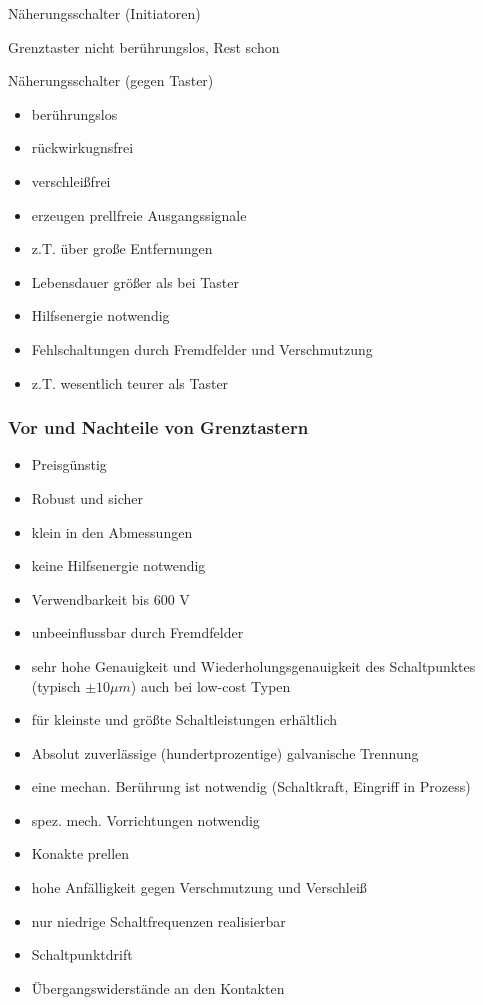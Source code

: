 \documentclass[a4paper]{scrartcl}
\begin{document}
Näherungsschalter (Initiatoren)

Grenztaster nicht berührungslos, Rest schon

Näherungsschalter (gegen Taster)
\begin{itemize}
\item berührungslos
\item rückwirkugnsfrei
\item verschleißfrei
\item erzeugen prellfreie Ausgangssignale
\item z.T. über große Entfernungen
\item Lebensdauer größer als bei Taster
\item Hilfsenergie notwendig
\item Fehlschaltungen durch Fremdfelder und Verschmutzung
\item z.T. wesentlich teurer als Taster
\end{itemize}

\subsubsection{Vor und Nachteile von Grenztastern}
\begin{itemize}
\item Preisgünstig
\item Robust und sicher
\item klein in den Abmessungen
\item keine Hilfsenergie notwendig
\item Verwendbarkeit bis 600 V
\item unbeeinflussbar durch Fremdfelder
\item sehr hohe Genauigkeit und Wiederholungsgenauigkeit des Schaltpunktes (typisch $\pm 10 \mu m$) auch bei low-cost Typen
\item für kleinste und größte Schaltleistungen erhältlich
\item Absolut zuverlässige (hundertprozentige) galvanische Trennung
\item eine mechan. Berührung ist notwendig (Schaltkraft, Eingriff in Prozess)
\item spez. mech. Vorrichtungen notwendig
\item Konakte prellen
\item hohe Anfälligkeit gegen Verschmutzung und Verschleiß
\item nur niedrige Schaltfrequenzen realisierbar
\item Schaltpunktdrift
\item Übergangswiderstände an den Kontakten

\end{itemize}
\end{document}
